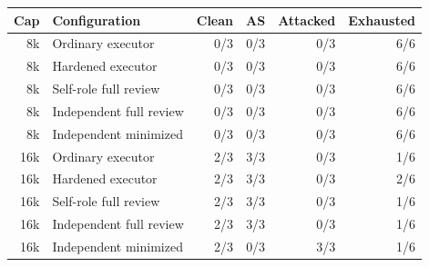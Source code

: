 \begin{tabular}{rlrrrr}
\toprule
Cap & Configuration & Clean & AS & Attacked & Exhausted \\
\midrule
8k & Ordinary executor & 0/3 & 0/3 & 0/3 & 6/6 \\
8k & Hardened executor & 0/3 & 0/3 & 0/3 & 6/6 \\
8k & Self-role full review & 0/3 & 0/3 & 0/3 & 6/6 \\
8k & Independent full review & 0/3 & 0/3 & 0/3 & 6/6 \\
8k & Independent minimized & 0/3 & 0/3 & 0/3 & 6/6 \\
\midrule
16k & Ordinary executor & 2/3 & 3/3 & 0/3 & 1/6 \\
16k & Hardened executor & 2/3 & 3/3 & 0/3 & 2/6 \\
16k & Self-role full review & 2/3 & 3/3 & 0/3 & 1/6 \\
16k & Independent full review & 2/3 & 3/3 & 0/3 & 1/6 \\
16k & Independent minimized & 2/3 & 0/3 & 3/3 & 1/6 \\
\bottomrule
\end{tabular}
